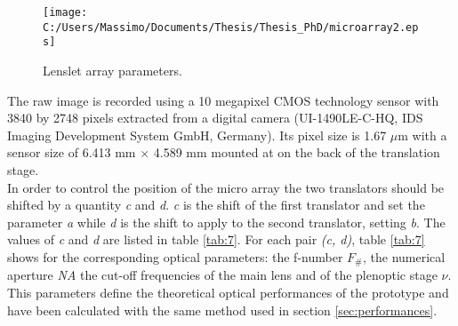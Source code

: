 \begin{figure}[H]
	\centering
	\texttt{[image: C:/Users/Massimo/Documents/Thesis/Thesis\_PhD/microarray2.eps]}
	\caption{\label{fig:micro array} Lenslet array parameters.}
\end{figure}
 The raw image is recorded using a 10 megapixel CMOS technology sensor with 3840 by 2748 pixels extracted from a digital camera (UI-1490LE-C-HQ, IDS Imaging Development System GmbH, Germany). Its pixel size is 1.67 $\mu$m with a sensor size of 6.413 mm $\times$ 4.589 mm mounted at on the back of the translation stage. \\
 In order to control the position of the micro array the two translators should be shifted by a quantity \textit{c} and \textit{d}. \textit{c} is the shift of the first translator and set the parameter \textit{a} while \textit{d} is the shift to apply to the second translator, setting \textit{b}. The values of \textit{c} and \textit{d} are listed in table \ref{tab:7}.
 For each pair \textit{(c, d)}, table \ref{tab:7} shows for the corresponding optical parameters: the f-number $F_\#$, the numerical aperture \textit{NA} the cut-off frequencies of the main lens and of the plenoptic stage $\nu$. This parameters define the theoretical optical performances of the prototype and have been calculated with the same method used in section \ref{sec:performances}.
 \newpage
